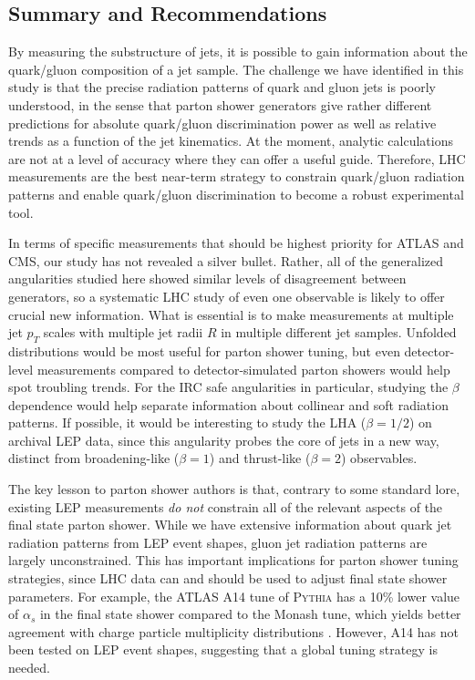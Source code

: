 \documentclass[11pt]{cernrep}
\begin{document}
\subsection{Summary and Recommendations}
\label{quarkgluon_sec:conclude}

By measuring the substructure of jets, it is possible to gain information about the quark/gluon composition of a jet sample.  The challenge we have identified in this study is that the precise radiation patterns of quark and gluon jets is poorly understood, in the sense that parton shower generators give rather different predictions for absolute quark/gluon discrimination power as well as relative trends as a function of the jet kinematics.  At the moment, analytic calculations are not at a level of accuracy where they can offer a useful guide.  Therefore, LHC measurements are the best near-term strategy to constrain quark/gluon radiation patterns and enable quark/gluon discrimination to become a robust experimental tool.

In terms of specific measurements that should be highest priority for ATLAS and CMS, our study has not revealed a silver bullet.  Rather, all of the generalized angularities studied here showed similar levels of disagreement between generators, so a systematic LHC study of even one observable is likely to offer crucial new information.  What is essential is to make measurements at multiple jet $p_T$ scales with multiple jet radii $R$ in multiple different jet samples.  Unfolded distributions would be most useful for parton shower tuning, but even detector-level measurements compared to detector-simulated parton showers would help spot troubling trends.  For the IRC safe angularities in particular, studying the $\beta$ dependence would help separate information about collinear and soft radiation patterns.  If possible, it would be interesting to study the LHA ($\beta = 1/2$) on archival LEP data, since this angularity probes the core of jets in a new way, distinct from broadening-like ($\beta = 1$) and thrust-like ($\beta = 2$) observables.

The key lesson to parton shower authors is that, contrary to some standard lore, existing LEP measurements \emph{do not} constrain all of the relevant aspects of the final state parton shower.  While we have extensive information about quark jet radiation patterns from LEP event shapes, gluon jet radiation patterns are largely unconstrained.  This has important implications for parton shower tuning strategies, since LHC data can and should be used to adjust final state shower parameters.  For example, the ATLAS A14 tune of \textsc{Pythia} has a 10\% lower value of $\alpha_s$ in the final state shower compared to the Monash tune, which yields better agreement with charge particle multiplicity distributions \cite{Aad:2016oit}.  However, A14 has not been tested on LEP event shapes, suggesting that a global tuning strategy is needed. 
\end{document}
